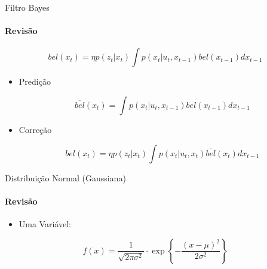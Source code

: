 \documentclass{beamer}
\begin{document}
\begin{frame}{Filtro Bayes}
    \framesubtitle{Revisão}
    
    \begin{block}{}
        \begin{equation*}
            bel(x_t) = \eta p(z_t| x_t) \int p(x_t| u_t, x_{t-1}) bel(x_{t-1})dx_{t-1}
        \end{equation*}
    \end{block}

    \begin{itemize}
        \item Predição
        
        \begin{equation*}
            \overline{bel}(x_t) = \int p(x_t| u_t, x_{t-1}) bel(x_{t-1})dx_{t-1}
        \end{equation*}

        \item Correção

        \begin{equation*}
            bel(x_t) = \eta p(z_t| x_t) \int p(x_t| u_t, x_{t}) \overline{bel}(x_{t})dx_{t-1}
        \end{equation*}
    \end{itemize}
\end{frame}


\begin{frame}{Distribuição Normal (Gaussiana)}
    \framesubtitle{Revisão}  
    \begin{itemize}
        \item Uma Variável:
    \end{itemize}

    \begin{block}{}
        \begin{equation*}
            f(x) = \dfrac{1}{\sqrt{2\pi\sigma^2}}\cdot 
        \exp\left\{-\frac{(x-\mu)^2}{2\sigma^2}\right\}
        \end{equation*}
    \end{block}

    
\end{frame}
\end{document}

